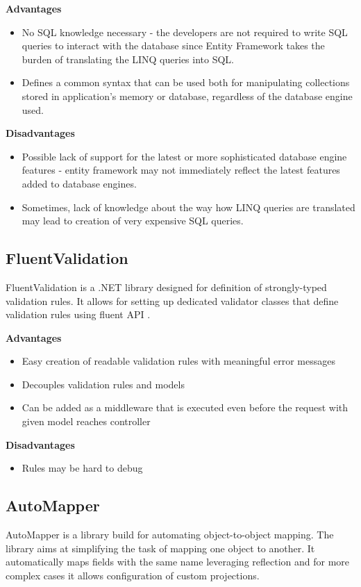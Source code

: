\textbf{Advantages}
\begin{itemize}
    \item No SQL knowledge necessary - the developers are not required to write SQL queries to interact with the database since Entity Framework takes the burden of translating the LINQ queries into SQL. 
    \item Defines a common syntax that can be used both for manipulating collections stored in application's memory or database, regardless of the database engine used.
\end{itemize}

\textbf{Disadvantages}
\begin{itemize}
    \item Possible lack of support for the latest or more sophisticated database engine features - entity framework may not immediately reflect the latest features added to database engines.
    \item Sometimes, lack of knowledge about the way how LINQ queries are translated may lead to creation of very expensive SQL queries.
\end{itemize}

\subsection{FluentValidation}
FluentValidation is a .NET library designed for definition of strongly-typed validation rules. It allows for setting up dedicated validator classes that define validation rules using fluent API \cite{fluentvalidation}.

\textbf{Advantages}
\begin{itemize}
    \item Easy creation of readable validation rules with meaningful error messages
    \item Decouples validation rules and models
    \item Can be added as a middleware that is executed even before the request with given model reaches controller
\end{itemize}
\textbf{Disadvantages}
\begin{itemize}
    \item Rules may be hard to debug
\end{itemize}

\subsection{AutoMapper}
AutoMapper is a library build for automating object-to-object mapping. The library aims at simplifying the task of mapping one object to another. It automatically maps fields with the same name leveraging reflection and for more complex cases it allows configuration of custom projections.

